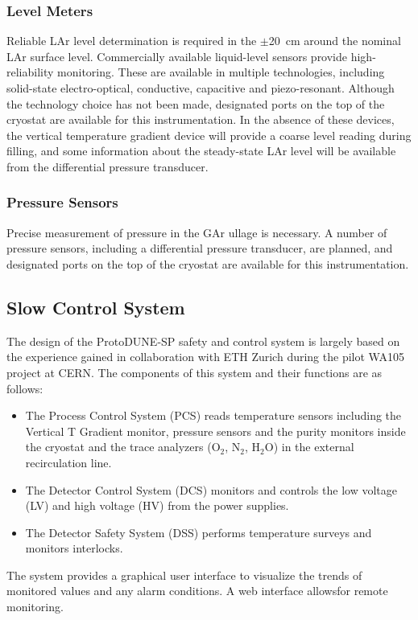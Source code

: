 \subsubsection{Level Meters}
	Reliable LAr level determination is required in the $\pm$20~cm around the nominal LAr surface level. Commercially available liquid-level sensors provide high-reliability monitoring. These are available in multiple technologies, %
	including solid-state electro-optical, %
	conductive, capacitive and piezo-resonant. Although the technology choice has not been made, %
	designated ports on the top of the cryostat are available for this instrumentation.
In the absence of these devices, the  vertical temperature gradient device will provide a coarse level reading during filling, and some information about the steady-state LAr level will be available from the 
differential pressure transducer.
 
\subsubsection{Pressure Sensors}
	Precise measurement of pressure in the GAr ullage is necessary. A number of pressure sensors, including a differential pressure transducer, are planned, %
	and designated ports on the top of the cryostat are available for this instrumentation.

\subsection{Slow Control System}

The design of the ProtoDUNE-SP safety and control system is largely based on the experience gained in collaboration with ETH Zurich during the pilot WA105 project at CERN. The components of this system and their functions are as follows:
\begin{itemize}
\item	The Process Control System (PCS) reads temperature sensors including the Vertical T Gradient monitor, pressure sensors and the purity monitors inside the cryostat and the trace analyzers (O$_2$, N$_2$, H$_2$O) in the external recirculation line.
\item	The Detector Control System (DCS) monitors and controls the low voltage (LV) and high voltage (HV) from the power supplies.
\item	The Detector Safety System (DSS) %
performs temperature surveys and monitors interlocks.
\end{itemize}
The system provides a graphical user interface to visualize the trends of monitored values and any alarm conditions.
 A web interface allowsfor remote monitoring. 

